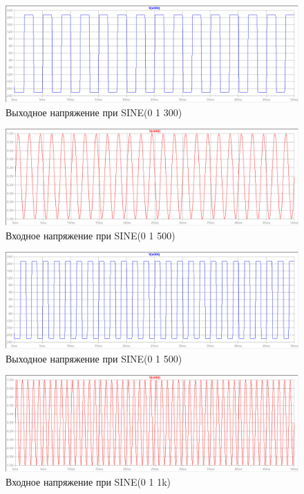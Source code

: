 \documentclass[a4paper, 12pt]{article}
\begin{document}
    \begin{figure}[H]
        \centering
        \includegraphics[scale=0.46]{3task_sine_out_1V_300f.png}
        \captionsetup{skip=0pt}
        \caption{Выходное напряжение при SINE(0 1 300)}
        \label{fig:3task_sine_out_1V_300f}
    \end{figure}
    \begin{figure}[H]
        \centering
        \includegraphics[scale=0.46]{3task_sine_in_1V_500f.png}
        \captionsetup{skip=0pt}
        \caption{Входное напряжение при SINE(0 1 500)}
        \label{fig:3task_sine_in_1V_500f}
    \end{figure}
    \begin{figure}[H]
        \centering
        \includegraphics[scale=0.46]{3task_sine_out_1V_500f.png}
        \captionsetup{skip=0pt}
        \caption{Выходное напряжение при SINE(0 1 500)}
        \label{fig:3task_sine_out_1V_500f}
    \end{figure}
    \begin{figure}[H]
        \centering
        \includegraphics[scale=0.46]{3task_sine_in_1V_1kf.png}
        \captionsetup{skip=0pt}
        \caption{Входное напряжение при SINE(0 1 1k)}
        \label{fig:3task_sine_in_1V_1kf}
    \end{figure}
\end{document}

